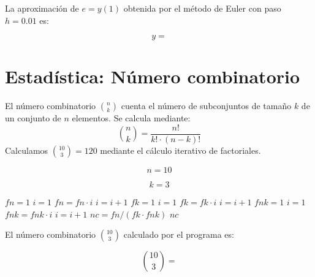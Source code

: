 \documentclass{article}
\begin{document}
La aproximación de $e = y(1)$ obtenida por el método de Euler con paso $h = 0.01$ es:

\begin{equation}
    y =
    \label{eq:res:y}
\end{equation}


\section{Estadística: Número combinatorio}

El número combinatorio $\binom{n}{k}$ cuenta el número de subconjuntos de tamaño
$k$ de un conjunto de $n$ elementos. Se calcula mediante:
\[
    \binom{n}{k} = \frac{n!}{k! \cdot (n-k)!}
\]
Calculamos $\binom{10}{3} = 120$ mediante el cálculo iterativo de factoriales.

\begin{equation}
    n = 10
    \label{eq:calc:n}
\end{equation}

\begin{equation}
    k = 3
    \label{eq:calc:k}
\end{equation}

\begin{algorithm}
\caption{Cálculo de $\binom{n}{k}$ mediante factoriales iterativos}
\begin{algorithmic}
    \STATE $fn = 1$
    \STATE $i = 1$
        \STATE $fn = fn \cdot i$
        \STATE $i = i + 1$
    \ENDWHILE
    \STATE $fk = 1$
    \STATE $i = 1$
        \STATE $fk = fk \cdot i$
        \STATE $i = i + 1$
    \ENDWHILE
    \STATE $fnk = 1$
    \STATE $i = 1$
        \STATE $fnk = fnk \cdot i$
        \STATE $i = i + 1$
    \ENDWHILE
    \STATE $nc = fn / (fk \cdot fnk)$
    \RETURN $nc$
\end{algorithmic}
\end{algorithm}

El número combinatorio $\binom{10}{3}$ calculado por el programa es:

\begin{equation}
    \binom{10}{3} =
    \label{eq:res:nc}
\end{equation}

\end{document}
